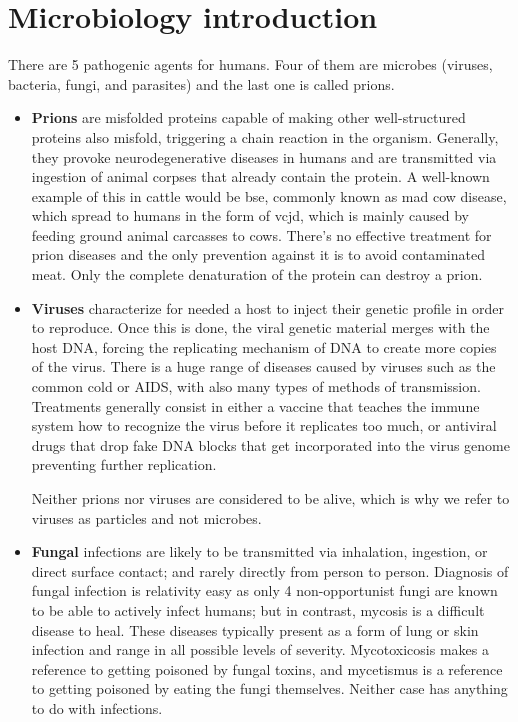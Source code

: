 \section{Microbiology introduction}

There are 5 pathogenic agents for humans. Four of them are microbes (viruses, bacteria, fungi, and parasites) and the last one is called prions.

\begin{itemize}

\item 
\textbf{Prions} are misfolded proteins capable of making other well-structured proteins also misfold, triggering a chain reaction in the organism. Generally, they provoke neurodegenerative diseases in humans and are transmitted via ingestion of animal corpses that already contain the protein. A well-known example of this in cattle would be \gls{bse}, commonly known as mad cow disease, which spread to humans in the form of \gls{vcjd}, which is mainly caused by feeding ground animal carcasses to cows. There's no effective treatment for prion diseases and the only prevention against it is to avoid contaminated meat. Only the complete denaturation of the protein can destroy a prion.

\item 
\textbf{Viruses} characterize for needed a host to inject their genetic profile in order to reproduce. Once this is done, the viral genetic material merges with the host DNA, forcing the replicating mechanism of DNA to create more copies of the virus. There is a huge range of diseases caused by viruses such as the common cold or AIDS, with also many types of methods of transmission. Treatments generally consist in either a vaccine that teaches the immune system how to recognize the virus before it replicates too much, or antiviral drugs that drop fake DNA blocks that get incorporated into the virus genome preventing further replication.

Neither prions nor viruses are considered to be alive, which is why we refer to viruses as particles and not microbes.

\item 
\textbf{Fungal} infections are likely to be transmitted via inhalation, ingestion, or direct surface contact; and rarely directly from person to person. Diagnosis of fungal infection is relativity easy as only 4 non-opportunist fungi are known to be able to actively infect humans; but in contrast, mycosis is a difficult disease to heal. These diseases typically present as a form of lung or skin infection and range in all possible levels of severity. Mycotoxicosis makes a reference to getting poisoned by fungal toxins, and mycetismus is a reference to getting poisoned by eating the fungi themselves. Neither case has anything to do with infections.



\end{itemize}
